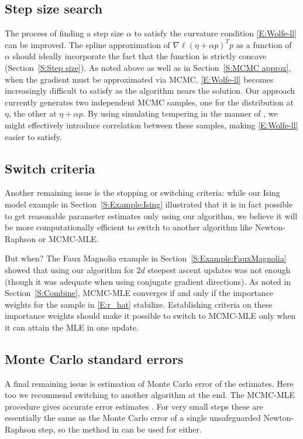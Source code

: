 \subsection{Step size search}
The process of finding a step size $\alpha$ to satisfy the curvature condition
 \eqref{E:Wolfe-ll} can be improved.
The spline approximation of $\nabla \ell(\eta + \alpha p)^T p$ as a function of $\alpha$ should ideally incorporate the fact that the function is strictly
concave (Section~\ref{S:Step size}).  
As noted above as well as in Section~\ref{S:MCMC approx}, when the gradient must be approximated
via MCMC, 
\eqref{E:Wolfe-ll} becomes increasingly difficult to satisfy as the algorithm nears the
solution.  Our approach currently generates two independent MCMC samples, one for
the distribution at $\eta$, the other at $\eta + \alpha p$.  By using simulating tempering
in the manner of \citet{Geyer:1995}, we might effectively introduce correlation between these
samples, making \eqref{E:Wolfe-ll} easier to satisfy.  

\subsection{Switch criteria}
Another remaining issue is the stopping or switching criteria: while our Ising model example
in Section~\ref{S:Example:Ising} illustrated that it is in fact possible to get reasonable 
parameter estimates only using our algorithm, we believe it will be more computationally
efficient to switch to another algorithm like Newton-Raphson or MCMC-MLE.  

But when?  
The Faux Magnolia example in Section~\ref{S:Example:FauxMagnolia} showed that using 
our algorithm for $2d$ steepest ascent updates was not enough (though it was adequate when
 using conjugate gradient directions).
As noted in Section~\ref{S:Combine}, MCMC-MLE converges if and only 
if the importance weights for the sample in \eqref{E:r_hat} stabilize.  Establishing criteria on these importance weights should make it 
possible to switch to MCMC-MLE only when it can attain the MLE in one update.

\subsection{Monte Carlo standard errors}
 A final remaining issue is estimation of Monte Carlo error of the estimates.  
 Here too we recommend switching to another
algorithm at the end.  The MCMC-MLE procedure gives accurate error estimates \citep{Geyer:1994,Hunter:2006}.
For very small steps these are essentially the same as the Monte Carlo error of a single unsafeguarded Newton-Raphson step,
so the method in \citep{Geyer:1994} can be used for either.




